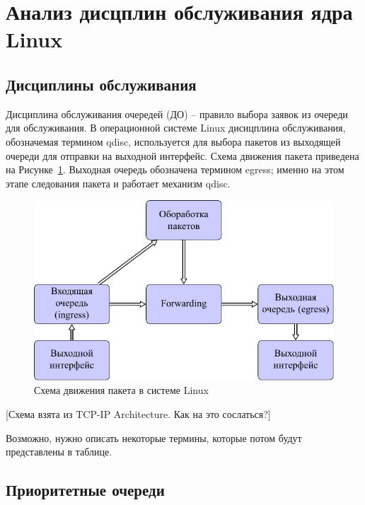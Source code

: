 \section{Анализ дисцплин обслуживания ядра Linux}

    \subsection{Дисциплины обслуживания}


	Дисциплина обслуживания очередей (ДО) -- правило выбора заявок
	из очереди для обслуживания\cite{Aliev}. В операционной системе Linux
	дисицплина обслуживания, обозначемая термином qdisc, используется
	для выбора пакетов из выходящей очереди для отправки на выходной интерфейс.
	Схема движения пакета приведена на Рисунке~\ref{pic:flow}. Выходная очередь
	обозначена термином egress; именно на этом этапе следования пакета
	и работает механизм qdisc.\cite{lartc}

    \begin{figure}[ht!]
        \center
        \includegraphics{pdfimages/qdisc.pdf}
        \caption{Схема движения пакета в системе Linux}
		\label{pic:flow}
    \end{figure}

	[Схема взята из TCP-IP Architecture. Как на это сослаться?]

	Возможно, нужно описать некоторые термины, которые потом будут представлены в таблице.

    \subsection{Приоритетные очереди}

